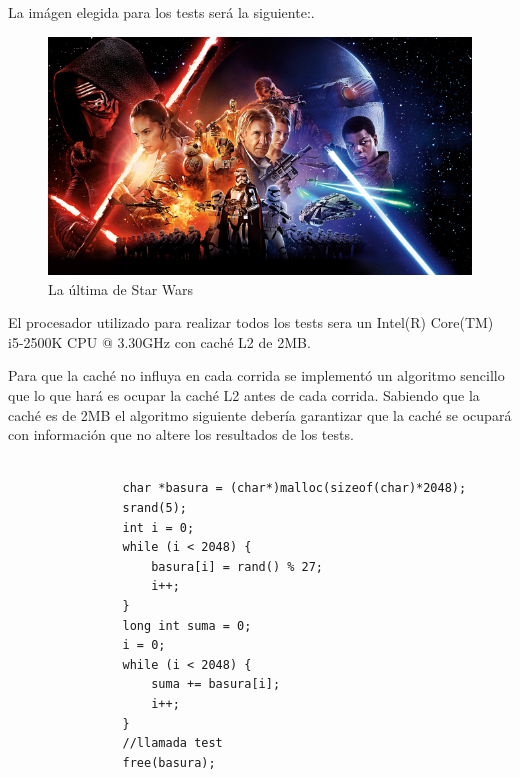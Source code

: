 La imágen elegida para los tests será la siguiente:.

\newpage

\begin{figure}
  \begin{center}
	\includegraphics[scale=.5]{imagenes/starWars.jpg}
	\caption{La última de Star Wars}
	\label{starwars}
  \end{center}
\end{figure}

El procesador utilizado para realizar todos los tests sera un Intel(R) Core(TM) i5-2500K CPU @ 3.30GHz con caché L2 de 2MB.

Para que la caché no influya en cada corrida se implementó un algoritmo sencillo que lo que hará es ocupar la caché L2 antes de cada corrida. Sabiendo que la caché es de 2MB el algoritmo siguiente debería garantizar que la caché se ocupará con información que no altere los resultados de los tests. \\

\begin{codesnippet}
\begin{verbatim}
                
                char *basura = (char*)malloc(sizeof(char)*2048);
                srand(5);
                int i = 0;
                while (i < 2048) {
                    basura[i] = rand() % 27;            
                    i++;                
                }
                long int suma = 0;
                i = 0;                
                while (i < 2048) {
                    suma += basura[i];   
                    i++;         
                }
                //llamada test
                free(basura);
                
\end{verbatim}
\end{codesnippet}

